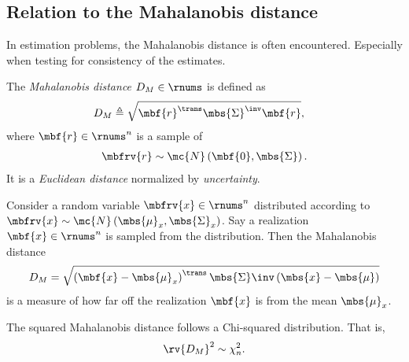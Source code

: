 \subsection{Relation to the Mahalanobis distance}
In estimation problems, the Mahalanobis distance is often encountered. Especially when testing for consistency of the estimates.
\begin{mydefinition}
    The \emph{Mahalanobis distance} $D_{M}\in\rnums$ is defined as 
    \begin{align}
        D_{M} &\triangleq \sqrt{\mbf{r}^{\trans}\mbs{\Sigma}^{\inv}\mbf{r}},
    \end{align}
    where $\mbf{r}\in\rnums^{n}$ is a sample of 
    \begin{align}
        \mbfrv{r} \sim\mc{N}\left( \mbf{0}, \mbs{\Sigma} \right).
    \end{align}
    It is a \emph{Euclidean distance} normalized by \emph{uncertainty}.
\end{mydefinition}
\begin{example}
    Consider a random variable $\mbfrv{x}\in\rnums^{n}$ distributed according to $\mbfrv{x}\sim\mc{N}\left(\mbs{\mu}_{x},\mbs{\Sigma}_{x}\right)$. Say a realization $\mbf{x}\in\rnums^{n}$ is sampled from the distribution. Then the Mahalanobis distance
    \begin{align}
        D_{M} = \sqrt{\left(\mbf{x}-\mbs{\mu}_{x}\right)^{\trans}\mbs{\Sigma}\inv\left( \mbs{x}-\mbs{\mu}\right)}
    \end{align}
    is a measure of how far off the realization $\mbf{x}$ is from the mean $\mbs{\mu}_{x}$.
    \triqed
\end{example}
\begin{mytheorem}   
    The squared Mahalanobis distance follows a Chi-squared distribution. That is, 
    \begin{align}
        \rv{D_{M}}^{2}\sim\chi^{2}_{n}.
    \end{align}
\end{mytheorem}
